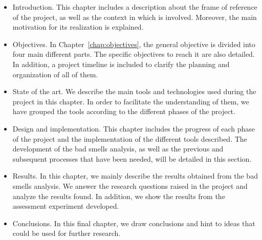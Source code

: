 \begin{itemize}
  \item Introduction. This chapter includes a description about the frame of reference of the project, as well as the context in which is involved. Moreover, the main motivation for its realization is explained.
  
  \item Objectives. In Chapter~\ref{chap:objectives}, the general objective is divided into four main different parts. The specific objectives to reach it are also detailed. In addition, a project timeline is included to clarify the planning and organization of all of them.
  
  \item State of the art. We describe the main tools and technologies used during the project in this chapter. In order to facilitate the understanding of them, we have grouped the tools according to the different phases of the project.
  
  \item Design and implementation. This chapter includes the progress of each phase of the project and the implementation of the different tools described. The development of the bad smells analysis, as well as the previous and subsequent processes that have been needed, will be detailed in this section. 
  
  \item Results. In this chapter, we mainly describe the results obtained from the bad smells analysis. We answer the research questions raised in the project and analyze the results found. In addition, we show the results from the assessment experiment developed.
  
  \item Conclusions. In this final chapter, we draw conclusions and hint to ideas that could be used for further research.
  
\end{itemize}

